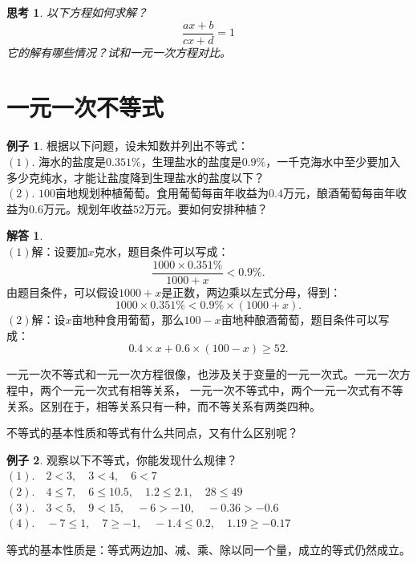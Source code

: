 \documentclass[12pt,UTF8]{ctexbook}
\theoremstyle{definition}
\newtheorem{ex}{例子}[section]
\newtheorem*{so}{解答}
\theoremstyle{plain}
\newtheorem{sk}{思考}[section]
\begin{document}
\begin{sk}\label{sk:4-0-0}
    以下方程如何求解？
    $$ \frac{ax + b}{cx + d} = 1$$
    它的解有哪些情况？试和一元一次方程对比。
\end{sk}

\section{一元一次不等式}

\begin{ex}\label{ex:4-1-0}
    根据以下问题，设未知数并列出不等式：\\
    $(1).$ 海水的盐度是$0.351\%$，生理盐水的盐度是$0.9\%$，一千克海水中至少要加入多少克纯水，才能让盐度降到生理盐水的盐度以下？\\
    $(2).$ $100$亩地规划种植葡萄。食用葡萄每亩年收益为$0.4$万元，酿酒葡萄每亩年收益为$0.6$万元。规划年收益$52$万元。要如何安排种植？
\end{ex}
\begin{so}
    \mbox{} \\
    $(1)$解：设要加$x$克水，题目条件可以写成：
    $$ \frac{1000 \times 0.351\%}{1000 + x} < 0.9\%.$$
    由题目条件，可以假设$1000+x$是正数，两边乘以左式分母，得到：
    $$ 1000 \times 0.351\% < 0.9\% \times (1000 + x).$$
    $(2)$解：设$x$亩地种食用葡萄，那么$100 - x$亩地种酿酒葡萄，题目条件可以写成：
    $$ 0.4 \times x + 0.6 \times (100 - x) \geqslant 52.$$
\end{so}
一元一次不等式和一元一次方程很像，也涉及关于变量的一元一次式。一元一次方程中，两个一元一次式有相等关系，
一元一次不等式中，两个一元一次式有不等关系。区别在于，相等关系只有一种，而不等关系有两类四种。

不等式的基本性质和等式有什么共同点，又有什么区别呢？
\begin{ex}\label{ex:4-1-10}
    观察以下不等式，你能发现什么规律？\\
    $(1).\quad 2 < 3, \quad 3 < 4, \quad 6 < 7$ \\
    $(2). \quad 4 \leqslant 7, \quad 6 \leqslant 10.5, \quad 1.2 \leqslant 2.1, \quad 28 \leqslant 49$ \\
    $(3). \quad 3 < 5, \quad 9 < 15, \quad -6 > -10, \quad -0.36 > -0.6$ \\
    $(4). \quad -7 \leqslant 1, \quad 7 \geqslant -1, \quad -1.4 \leqslant 0.2, \quad 1.19 \geqslant -0.17$ 
\end{ex}

等式的基本性质是：等式两边加、减、乘、除以同一个量，成立的等式仍然成立。
\end{document}
